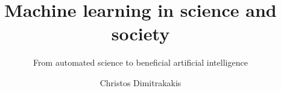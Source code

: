 \documentclass[a4paper,twoside]{book}
\begin{document}
\title{Machine learning in science and society}
\subtitle{From automated science to beneficial artificial intelligence}
\author[C. Dimitrakakis]{Christos Dimitrakakis}


\maketitle



\tableofcontents





%

%
%
%
%


\appendix

%



\printindex




\end{document}
